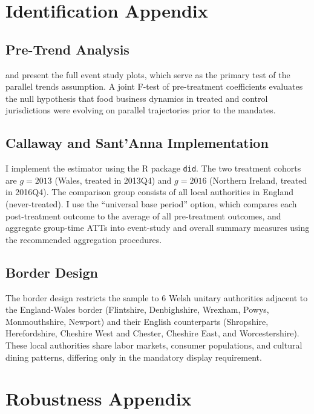 \documentclass[12pt]{article}
\begin{document}
\section{Identification Appendix}
\label{app:identification}

\subsection{Pre-Trend Analysis}

 and  present the full event study plots, which serve as the primary test of the parallel trends assumption. A joint F-test of pre-treatment coefficients evaluates the null hypothesis that food business dynamics in treated and control jurisdictions were evolving on parallel trajectories prior to the mandates.

\subsection{Callaway and Sant'Anna Implementation}

I implement the \citet{callaway2021difference} estimator using the R package \texttt{did}. The two treatment cohorts are $g=2013$ (Wales, treated in 2013Q4) and $g=2016$ (Northern Ireland, treated in 2016Q4). The comparison group consists of all local authorities in England (never-treated). I use the ``universal base period'' option, which compares each post-treatment outcome to the average of all pre-treatment outcomes, and aggregate group-time ATTs into event-study and overall summary measures using the recommended aggregation procedures.

\subsection{Border Design}

The border design restricts the sample to 6 Welsh unitary authorities adjacent to the England-Wales border (Flintshire, Denbighshire, Wrexham, Powys, Monmouthshire, Newport) and their English counterparts (Shropshire, Herefordshire, Cheshire West and Chester, Cheshire East, and Worcestershire). These local authorities share labor markets, consumer populations, and cultural dining patterns, differing only in the mandatory display requirement.


\section{Robustness Appendix}
\label{app:robustness}
\end{document}
